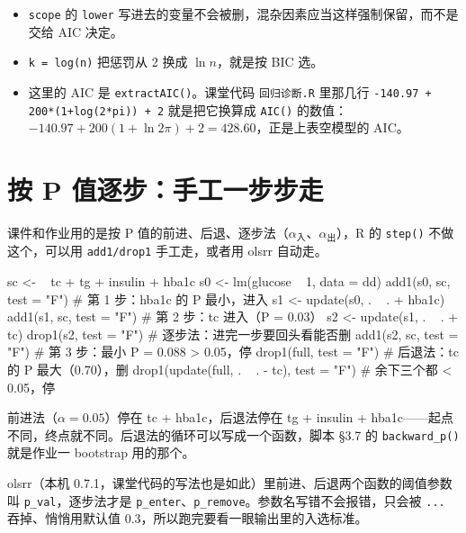 \begin{itemize}
\item \Verb|scope| 的 \Verb|lower| 写进去的变量不会被删，混杂因素应当这样强制保留，而不是交给 AIC 决定。
\item \Verb|k = log(n)| 把惩罚从 2 换成 $\ln n$，就是按 BIC 选。
\item 这里的 AIC 是 \Verb|extractAIC()|。课堂代码 \Verb|回归诊断.R| 里那几行 \Verb|-140.97 + 200*(1+log(2*pi)) + 2| 就是把它换算成 \Verb|AIC()| 的数值：$-140.97+200(1+\ln2\pi)+2=428.60$，正是上表空模型的 AIC。
\end{itemize}

\section{按 P 值逐步：手工一步步走}
课件和作业用的是按 P 值的前进、后退、逐步法（$\alpha_{\text{入}}$、$\alpha_{\text{出}}$），R 的 \Verb|step()| 不做这个，可以用 \Verb|add1/drop1| 手工走，或者用 olsrr 自动走。

\begin{rcode}
sc <- ~ tc + tg + insulin + hba1c
s0 <- lm(glucose ~ 1, data = dd)
add1(s0, sc, test = "F")                    # 第 1 步：hba1c 的 P 最小，进入
s1 <- update(s0, . ~ . + hba1c)
add1(s1, sc, test = "F")                    # 第 2 步：tc 进入（P = 0.03）
s2 <- update(s1, . ~ . + tc)
drop1(s2, test = "F")                       # 逐步法：进完一步要回头看能否删
add1(s2, sc, test = "F")                    # 第 3 步：最小 P = 0.088 > 0.05，停
drop1(full, test = "F")                     # 后退法：tc 的 P 最大（0.70），删
drop1(update(full, . ~ . - tc), test = "F") # 余下三个都 < 0.05，停
\end{rcode}
前进法（$\alpha=0.05$）停在 tc + hba1c，后退法停在 tg + insulin + hba1c——起点不同，终点就不同。后退法的循环可以写成一个函数，脚本 §3.7 的 \Verb|backward_p()| 就是作业一 bootstrap 用的那个。

olsrr（本机 0.7.1，课堂代码的写法也是如此）里前进、后退两个函数的阈值参数叫 \Verb|p_val|，逐步法才是 \Verb|p_enter|、\Verb|p_remove|。参数名写错不会报错，只会被 \Verb|...| 吞掉、悄悄用默认值 0.3，所以跑完要看一眼输出里的入选标准。

